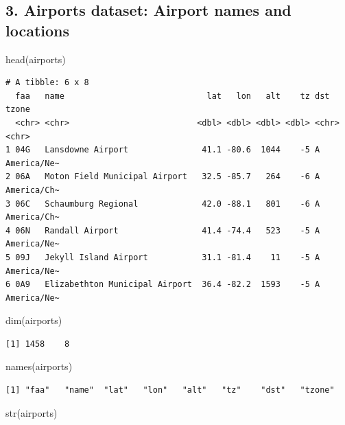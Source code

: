 \documentclass[
  10pt,
  letterpaper,
  DIV=11,
  numbers=noendperiod]{scrartcl}
\newenvironment{Shaded}{\begin{snugshade}}{\end{snugshade}}
\newcommand{\FunctionTok}[1]{\textcolor[rgb]{0.28,0.35,0.67}{#1}}
\newcommand{\NormalTok}[1]{\textcolor[rgb]{0.00,0.23,0.31}{#1}}
\begin{document}
\subsection{3. Airports dataset: Airport names and
locations}\label{airports-dataset-airport-names-and-locations}

\begin{Shaded}
\begin{Highlighting}[numbers=left,,]
\FunctionTok{head}\NormalTok{(airports)}
\end{Highlighting}
\end{Shaded}

\begin{verbatim}
# A tibble: 6 x 8
  faa   name                             lat   lon   alt    tz dst   tzone      
  <chr> <chr>                          <dbl> <dbl> <dbl> <dbl> <chr> <chr>      
1 04G   Lansdowne Airport               41.1 -80.6  1044    -5 A     America/Ne~
2 06A   Moton Field Municipal Airport   32.5 -85.7   264    -6 A     America/Ch~
3 06C   Schaumburg Regional             42.0 -88.1   801    -6 A     America/Ch~
4 06N   Randall Airport                 41.4 -74.4   523    -5 A     America/Ne~
5 09J   Jekyll Island Airport           31.1 -81.4    11    -5 A     America/Ne~
6 0A9   Elizabethton Municipal Airport  36.4 -82.2  1593    -5 A     America/Ne~
\end{verbatim}

\begin{Shaded}
\begin{Highlighting}[numbers=left,,]
\FunctionTok{dim}\NormalTok{(airports)}
\end{Highlighting}
\end{Shaded}

\begin{verbatim}
[1] 1458    8
\end{verbatim}

\begin{Shaded}
\begin{Highlighting}[numbers=left,,]
\FunctionTok{names}\NormalTok{(airports)}
\end{Highlighting}
\end{Shaded}

\begin{verbatim}
[1] "faa"   "name"  "lat"   "lon"   "alt"   "tz"    "dst"   "tzone"
\end{verbatim}

\begin{Shaded}
\begin{Highlighting}[numbers=left,,]
\FunctionTok{str}\NormalTok{(airports)}
\end{Highlighting}
\end{Shaded}
\end{document}
